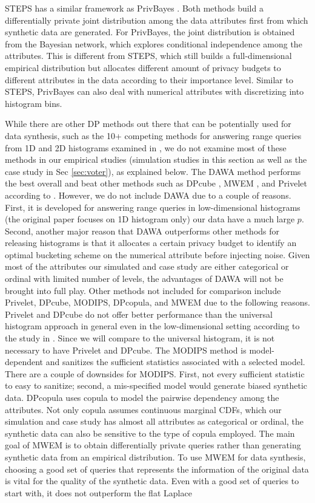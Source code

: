 \documentclass[12pt, A4]{article}
\theoremstyle{plain}
\theoremstyle{exampstyle}\newtheorem{defn}{Definition}
\theoremstyle{exampstyle}\newtheorem{lem}{Lemma}
\theoremstyle{exampstyle}\newtheorem{cor}{Corollary}
\theoremstyle{exampstyle}\newtheorem{pro}{Proposition}
\theoremstyle{exampstyle}\newtheorem{cla}{Claim}
\theoremstyle{exampstyle}\newtheorem{rem}{Remark}
\begin{document}
STEPS has a similar framework as PrivBayes \citep{zhang2017privbayes}. Both methods build a differentially private joint distribution among the data attributes first from which synthetic data are generated. For PrivBayes, the joint distribution is obtained from the Bayesian network, which explores conditional independence among the attributes. This is different from STEPS, which still builds a full-dimensional empirical distribution but allocates different amount of privacy budgets to different attributes in the data according to their importance level. Similar to STEPS, PrivBayes can also deal with numerical attributes with discretizing into histogram bins. 

While there are other DP methods out there that can be potentially used for data synthesis, such as the 10+ competing methods for answering range queries from 1D and 2D histograms examined in \citet{hay2016principled}, we do not examine most of these methods in our empirical studies (simulation studies in this section as well as the case study in Sec \ref{sec:voter}), as explained below. The DAWA method \citep{dawa} performs the best overall and beat other methods such as DPcube \citep{DPcube}, MWEM \citep{hardt2012simple}, and Privelet \citep{privelet} according to \citet{hay2016principled}. However, we do not include DAWA due to a couple of reasons. First, it is developed for answering range queries in low-dimensional histograms (the original paper focuses on 1D histogram only) our data have a much large $p$. Second, another major reason that DAWA outperforms other methods for releasing histograms is that it allocates a certain privacy budget to identify an optimal bucketing scheme on the numerical attribute before injecting noise. Given most of the attributes our simulated and case study are either categorical or ordinal with limited number of levels, the advantages of DAWA will not be brought into full play. Other methods not included for comparison include Privelet, DPcube, MODIPS, DPcopula, and MWEM due to the following reasons. Privelet and DPcube do not offer better performance than the universal histogram approach in general even in the low-dimensional setting according to the study in \citet{hay2016principled}. Since we will compare to the universal histogram, it is not necessary to have Privelet and DPcube. The MODIPS method is model-dependent and sanitizes the sufficient statistics associated with a selected model. There are a couple of downsides for MODIPS. First, not every sufficient statistic to easy to sanitize; second, a mis-specified model would generate biased synthetic data. DPcopula uses copula to model the pairwise dependency among the attributes. Not only copula assumes continuous marginal CDFs, which our simulation and case study has almost all attributes as categorical or ordinal, the synthetic data can also be sensitive to the type of copula employed. The main goal of MWEM is to obtain differentially private queries rather than generating synthetic data from an empirical distribution. To use MWEM for data synthesis, choosing a good set of queries that represents the information of the original data is vital for the quality of the synthetic data. Even with a good set of queries to start with, it does not outperform the flat Laplace 
\end{document}

